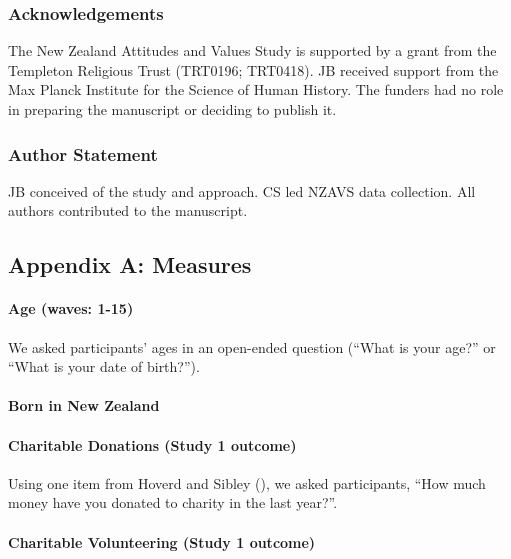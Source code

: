 \documentclass[
  single column]{article}
\let\oldparagraph\paragraph
\renewcommand{\paragraph}[1]{\oldparagraph{#1}\mbox{}}
\begin{document}
\subsubsection{Acknowledgements}\label{acknowledgements}

The New Zealand Attitudes and Values Study is supported by a grant from
the Templeton Religious Trust (TRT0196; TRT0418). JB received support
from the Max Planck Institute for the Science of Human History. The
funders had no role in preparing the manuscript or deciding to publish
it.

\subsubsection{Author Statement}\label{author-statement}

JB conceived of the study and approach. CS led NZAVS data collection.
All authors contributed to the manuscript.

\newpage{}

\subsection{Appendix A: Measures}\label{appendix-measures}

\paragraph{Age (waves: 1-15)}\label{age-waves-1-15}

We asked participants' ages in an open-ended question (``What is your
age?'' or ``What is your date of birth?'').

\paragraph{Born in New Zealand}\label{born-in-new-zealand}

\paragraph{Charitable Donations (Study 1
outcome)}\label{charitable-donations-study-1-outcome}

Using one item from Hoverd and Sibley
(), we asked participants,
``How much money have you donated to charity in the last year?''.

\paragraph{Charitable Volunteering (Study 1
outcome)}\label{charitable-volunteering-study-1-outcome}
\end{document}
